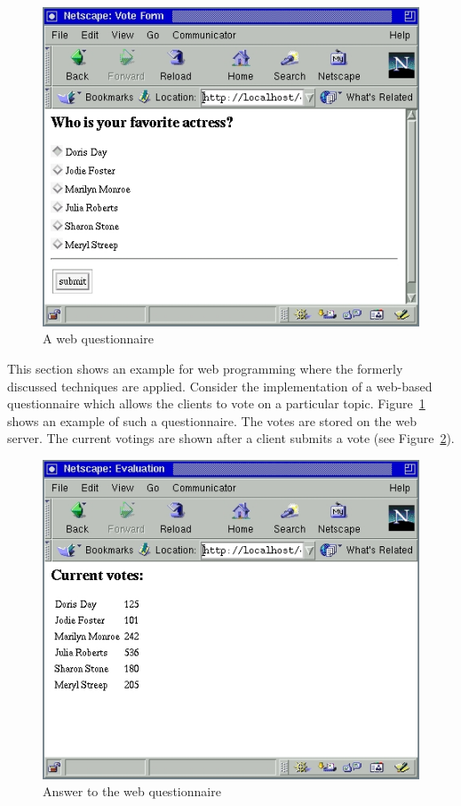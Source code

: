 \begin{figure}[t]
\begin{center}
\includegraphics[scale=0.8]{PICTURES/quest.jpg}
\end{center}\vspace{-3ex}
\caption{A web questionnaire\label{fig-quest}}
\end{figure}

This section shows an example for web programming
where the formerly discussed techniques are applied.
Consider the implementation of a web-based questionnaire
which allows the clients to vote on a particular topic.
Figure~\ref{fig-quest} shows an example of such a questionnaire.
The votes are stored on the web server.
The current votings are shown after a client
submits a vote (see Figure~\ref{fig-quest-answer}).

\begin{figure}[t]
\begin{center}
\includegraphics[scale=0.8]{PICTURES/quest_answer.jpg}
\end{center}\vspace{-3ex}
\caption{Answer to the web questionnaire\label{fig-quest-answer}}
\end{figure}

